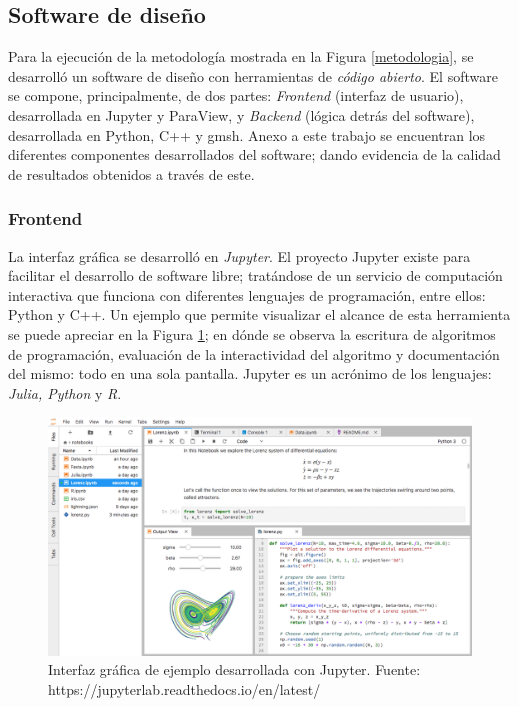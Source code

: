 \subsection{Software de dise\~no} \label{software}

\noindent
\justify

Para la ejecuci\'on de la metodolog\'ia mostrada en la Figura \ref{metodologia}, se desarroll\'o un software de dise\~no con herramientas de \textit{c\'odigo abierto}. El software se compone, principalmente, de dos partes: \textit{Frontend} (interfaz de usuario), desarrollada en Jupyter y ParaView, y \textit{Backend} (l\'ogica detr\'as del software), desarrollada en Python, C++ y gmsh. Anexo a este trabajo se encuentran los diferentes componentes desarrollados del software; dando evidencia de la calidad de resultados obtenidos a trav\'es de este.

\subsubsection{Frontend}

\noindent
\justify

La interfaz gr\'afica se desarroll\'o en \textit{Jupyter}. El proyecto Jupyter existe para facilitar el desarrollo de software libre; trat\'andose de un servicio de computaci\'on interactiva que funciona con diferentes lenguajes de programaci\'on, entre ellos: Python y C++. Un ejemplo que permite visualizar el alcance de esta herramienta se puede apreciar en la Figura \ref{jupyter}; en d\'onde se observa la escritura de algoritmos de programaci\'on, evaluaci\'on de la interactividad del algoritmo y documentaci\'on del mismo: todo en una sola pantalla. Jupyter es un acr\'onimo de los lenguajes: \textit{Julia, Python} y \textit{R}.

\begin{figure}[h!]
	\centering
	\includegraphics[width=\textwidth]{Images/jupyterlab.png}
	\caption{Interfaz gr\'afica de ejemplo desarrollada con Jupyter. Fuente: https://jupyterlab.readthedocs.io/en/latest/}
	\label{jupyter}
\end{figure}

